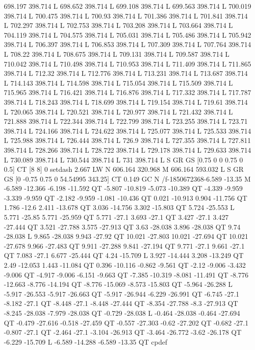 698.197 398.714 L
698.652 398.714 L
699.108 398.714 L
699.563 398.714 L
700.019 398.714 L
700.475 398.714 L
700.93 398.714 L
701.386 398.714 L
701.841 398.714 L
702.297 398.714 L
702.753 398.714 L
703.208 398.714 L
703.664 398.714 L
704.119 398.714 L
704.575 398.714 L
705.031 398.714 L
705.486 398.714 L
705.942 398.714 L
706.397 398.714 L
706.853 398.714 L
707.309 398.714 L
707.764 398.714 L
708.22 398.714 L
708.675 398.714 L
709.131 398.714 L
709.587 398.714 L
710.042 398.714 L
710.498 398.714 L
710.953 398.714 L
711.409 398.714 L
711.865 398.714 L
712.32 398.714 L
712.776 398.714 L
713.231 398.714 L
713.687 398.714 L
714.143 398.714 L
714.598 398.714 L
715.054 398.714 L
715.509 398.714 L
715.965 398.714 L
716.421 398.714 L
716.876 398.714 L
717.332 398.714 L
717.787 398.714 L
718.243 398.714 L
718.699 398.714 L
719.154 398.714 L
719.61 398.714 L
720.065 398.714 L
720.521 398.714 L
720.977 398.714 L
721.432 398.714 L
721.888 398.714 L
722.344 398.714 L
722.799 398.714 L
723.255 398.714 L
723.71 398.714 L
724.166 398.714 L
724.622 398.714 L
725.077 398.714 L
725.533 398.714 L
725.988 398.714 L
726.444 398.714 L
726.9 398.714 L
727.355 398.714 L
727.811 398.714 L
728.266 398.714 L
728.722 398.714 L
729.178 398.714 L
729.633 398.714 L
730.089 398.714 L
730.544 398.714 L
731 398.714 L
S
GR
GS
[0.75 0 0 0.75 0 0.5] CT
[8 8] 0 setdash
2.667 LW
N
606.164 320.968 M
606.164 593.032 L
S
GR
GS
[0 -0.75 0.75 0 54.54995 343.25] CT
0.149 GC
N
/f-1850672368{-6.589 -13.35 M
-6.589 -12.366 -6.198 -11.592 QT
-5.807 -10.819 -5.073 -10.389 QT
-4.339 -9.959 -3.339 -9.959 QT
-2.182 -9.959 -1.081 -10.436 QT
0.021 -10.913 0.904 -11.756 QT
1.786 -12.6 2.411 -13.678 QT
3.036 -14.756 3.302 -15.803 QT
5.724 -25.553 L
5.771 -25.85 5.771 -25.959 QT
5.771 -27.1 3.693 -27.1 QT
3.427 -27.1 3.427 -27.444 QT
3.521 -27.788 3.575 -27.913 QT
3.63 -28.038 3.896 -28.038 QT
9.74 -28.038 L
9.865 -28.038 9.943 -27.92 QT
10.021 -27.803 10.021 -27.694 QT
10.021 -27.678 9.966 -27.483 QT
9.911 -27.288 9.841 -27.194 QT
9.771 -27.1 9.661 -27.1 QT
7.083 -27.1 6.677 -25.444 QT
4.24 -15.709 L
3.927 -14.444 3.208 -13.249 QT
2.49 -12.053 1.443 -11.084 QT
0.396 -10.116 -0.862 -9.561 QT
-2.12 -9.006 -3.432 -9.006 QT
-4.917 -9.006 -6.151 -9.663 QT
-7.385 -10.319 -8.081 -11.491 QT
-8.776 -12.663 -8.776 -14.194 QT
-8.776 -15.069 -8.573 -15.803 QT
-5.964 -26.288 L
-5.917 -26.553 -5.917 -26.663 QT
-5.917 -26.944 -6.229 -26.991 QT
-6.745 -27.1 -8.182 -27.1 QT
-8.448 -27.1 -8.448 -27.444 QT
-8.354 -27.788 -8.3 -27.913 QT
-8.245 -28.038 -7.979 -28.038 QT
-0.729 -28.038 L
-0.464 -28.038 -0.464 -27.694 QT
-0.479 -27.616 -0.518 -27.459 QT
-0.557 -27.303 -0.62 -27.202 QT
-0.682 -27.1 -0.807 -27.1 QT
-2.464 -27.1 -3.104 -26.913 QT
-3.464 -26.772 -3.62 -26.178 QT
-6.229 -15.709 L
-6.589 -14.288 -6.589 -13.35 QT
cp}def
